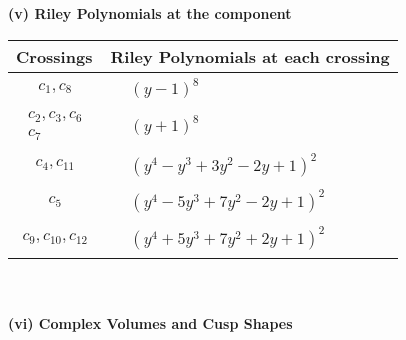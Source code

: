 \documentclass[1p]{elsarticle_modified}
\theoremstyle{definition}
\begin{document}
\newpage\renewcommand{\arraystretch}{1}
\flushleft \textbf{(v) Riley Polynomials at the component}\newline \\
\begin{tabular}{m{50pt}|m{274pt}}
Crossings & \hspace{64pt}Riley Polynomials at each crossing \\
\hline $$\begin{aligned}c_{1},c_{8}\end{aligned}$$&$\begin{aligned}
&(y-1)^8
\end{aligned}$\\
\hline $$\begin{aligned}c_{2},c_{3},c_{6}\\c_{7}\end{aligned}$$&$\begin{aligned}
&(y+1)^8
\end{aligned}$\\
\hline $$\begin{aligned}c_{4},c_{11}\end{aligned}$$&$\begin{aligned}
&(y^4- y^3+3 y^2-2 y+1)^2
\end{aligned}$\\
\hline $$\begin{aligned}c_{5}\end{aligned}$$&$\begin{aligned}
&(y^4-5 y^3+7 y^2-2 y+1)^2
\end{aligned}$\\
\hline $$\begin{aligned}c_{9},c_{10},c_{12}\end{aligned}$$&$\begin{aligned}
&(y^4+5 y^3+7 y^2+2 y+1)^2
\end{aligned}$\\
\hline
\end{tabular}\\~\\
\newpage\flushleft \textbf{(vi) Complex Volumes and Cusp Shapes}
\end{document}
